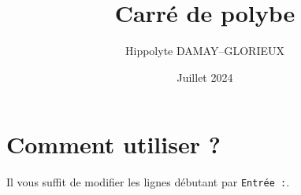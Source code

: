 \documentclass{article}
\title{Carré de polybe}
\author{Hippolyte DAMAY--GLORIEUX}
\date{Juillet 2024}
\begin{document}
\maketitle

\section{Comment utiliser ?}

Il vous suffit de modifier les lignes débutant par \verb|Entrée :|.


\newcount\size      {}
\newcount\absi      %
\newcount\ordo      %
\newcount\char      %
\newcount\posi      %

\newcommand{\modulo}[2]{\def\modloop{\newcount\temp\temp=\a
\advance\temp by-\n
\ifnum\temp<0\let\next=\relax
\else\a=\temp
\fi\next
}\newcount\a\newcount\n\a=#1\n=#2
\let\next=\modloop
\modloop
\ifnum\a=0\absi=5
\else\absi=\a
\fi
}

\newcommand{\ordonnees}[2]{\newcount\a\newcount\q\a=#1\q=#2
\advance\a by-1\divide\a by\q\advance\a by1\ordo=\a}

\newcommand{\polybeCypher}[1]{\charToInt{#1}\ordonnees{\the\posi}{\the\size}\modulo{\the\posi}{\the\size}}

\def\charToInt #1{\def\a{a}\def\b{b}\def\c{c}\def\d{d}\def\e{e}\def\f{f}\def\g{g}\def\h{h}\def\i{i}\def\j{j}\def\k{k}\def\l{l}\def\m{m}\def\n{n}\def\o{o}\def\p{p}\def\q{q}\def\r{r}\def\s{s}\def\t{t}\def\u{u}\def\v{v}\def\w{w}\def\x{x}\def\y{y}\def\z{z}\if\a#1\posi=1\else\if\b#1\posi=2\else\if\c#1\posi=3\else\if\d#1\posi=4\else\if\e#1\posi=5\else\if\f#1\posi=6\else\if\g#1\posi=7\else\if\h#1\posi=8\else\if\i#1\posi=9\else\if\j#1\posi=9\else\if\k#1\posi=10\else\if\l#1\posi=11\else\if\m#1\posi=12\else\if\n#1\posi=13\else\if\o#1\posi=14\else\if\p#1\posi=15\else\if\q#1\pos=16\else\if\r#1\posi=17\else\if\s#1\posi=18\else\if\t#1\posi=19\else\if\u#1\posi=20\else\if\v#1\posi=21\else\if\w#1\posi=22\else\if\x#1\posi=23\else\if\y#1\posi=24\else\if\z#1\posi=25\else\posi=0\fi\fi\fi\fi\fi\fi\fi\fi\fi\fi\fi\fi\fi\fi\fi\fi\fi\fi\fi\fi\fi\fi\fi\fi\fi\fi}

\def\cypher #1{\spell#1{}}
\def\spell  #1{\ifx^#1^\else\polybeCypher{#1}\the\ordo\the\absi\expandafter\spell\fi}
\end{document}
